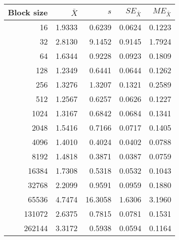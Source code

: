 \begin{tabular}{rrrrr}\toprule
{\small Block size} & $\bar{X}$ & $s$ & $SE_{\bar{X}}$ & $ME_{\bar{X}}$ \\\midrule
16 & 1.9333 & 0.6239 & 0.0624 & 0.1223\\
32 & 2.8130 & 9.1452 & 0.9145 & 1.7924\\
64 & 1.6344 & 0.9228 & 0.0923 & 0.1809\\
128 & 1.2349 & 0.6441 & 0.0644 & 0.1262\\
256 & 1.3276 & 1.3207 & 0.1321 & 0.2589\\
512 & 1.2567 & 0.6257 & 0.0626 & 0.1227\\
1024 & 1.3167 & 0.6842 & 0.0684 & 0.1341\\
2048 & 1.5416 & 0.7166 & 0.0717 & 0.1405\\
4096 & 1.4010 & 0.4024 & 0.0402 & 0.0788\\
8192 & 1.4818 & 0.3871 & 0.0387 & 0.0759\\
16384 & 1.7308 & 0.5318 & 0.0532 & 0.1043\\
32768 & 2.2099 & 0.9591 & 0.0959 & 0.1880\\
65536 & 4.7474 & 16.3058 & 1.6306 & 3.1960\\
131072 & 2.6375 & 0.7815 & 0.0781 & 0.1531\\
262144 & 3.3172 & 0.5938 & 0.0594 & 0.1164\\
\bottomrule
\end{tabular}

